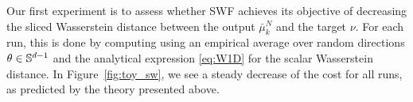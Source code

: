 


Our first experiment is to assess whether SWF achieves its objective of decreasing the sliced Wasserstein distance between the output $\bar{\mu}_{k}^{N}$ and the target $\nu$. For each run, this is done by computing \label{eqn:sw} using an empirical average over random directions $\theta\in\mathbb{S}^{d-1}$ and the analytical expression \eqref{eq:W1D} for the scalar Wasserstein distance. In Figure~\ref{fig:toy_sw}, we see a steady decrease of the cost for all runs, as predicted by the theory presented above.


